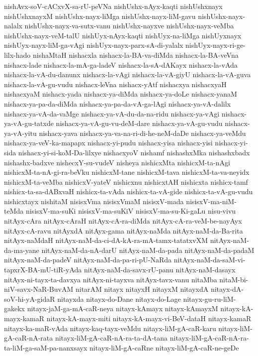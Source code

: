 {nishAvx-soV-cACxvX-sa-rU-peVNa
nishUshx-nAyx-kaqti
nishUshxnayx
nishUshxnayxM
nishUshx-nayx-liMga
nishUshx-nayx-liM-gavu
nishUshx-nayx-nalalx
nishUshx-nayx-va-sutx-vanu
nishUshx-nayxve
nishUshx-nayx-veMba
nishUshx-nayx-veM-talU
nishUyx-nAyx-kaqti
nishUyx-na-liMga
nishUyxnayx
nishUyx-nayx-liM-ga-vAgi
nishUyx-nayx-parx-sA-di-yalalx
nishUyx-nayx-ri-ge-lilx-hado
nishaMtaH
nishacxla
nishacx-la-BA-va-diMda
nishacx-la-BA-veVna
nishacx-lade
nishacx-la-mA-ga-ladeV
nishacx-la-sA-dAKayx
nishacx-la-vAda
nishacx-la-vA-du-danunx
nishacx-la-vAgi
nishacx-la-vA-giyU
nishacx-la-vA-guva
nishacx-la-vA-gu-vudu
nishacx-leVna
nishacx-yAtf
nishacxya
nishacxyaH
nishacxyaM
nishacx-yada
nishacx-ya-diMda
nishacx-ya-doLe
nishacx-yanaM
nishacx-ya-pa-da-diMda
nishacx-ya-pa-da-vA-ga-lAgi
nishacx-ya-vA-dalilx
nishacx-ya-vA-da-vaMge
nishacx-ya-vA-du-da-na-ridu
nishacx-ya-vAgi
nishacx-ya-vA-gu-tatxde
nishacx-ya-vA-gu-vu-deM-dare
nishacx-ya-vA-gu-vudu
nishacx-ya-vA-yitu
nishacx-yava
nishacx-ya-va-na-ri-di-he-neM-daDe
nishacx-ya-veMdu
nishacx-ya-veV-ka-mapapx
nishacx-yi-pudu
nishacx-yisa
nishacx-yisi
nishacx-yi-sida
nishacx-yi-si-koM-Da-lilxye
nishacxyoV
nishamf
nishashxMka
nishashxbadx
nishashx-badxve
nishecxY-su-vudeV
nisheya
nishicxMta
nishicxM-ta-nAgi
nishicxM-ta-nA-gi-ra-beVku
nishicxM-tane
nishicxM-tava
nishicxM-ta-va-neyidx
nishicxM-ta-veMba
nishicxV-yateV
nishicxnu
nishicxtAH
nishicxta
nishicx-tamf
nishicx-ta-sa-dABxvaH
nishicx-ta-vAda
nishicx-ta-vA-gide
nishicx-ta-vA-gu-vudu
nishicxtayx
nishitaM
nisisxVma
nisisxVmaM
nisisxV-mada
nisisxV-ma-niM-teMda
nisisxV-ma-suKi
nisisxV-ma-suKiV
nisisxV-ma-su-Ki-gaLu
nisu-vivu
nitAyx-cAra
nitAyx-cAraH
nitAyx-cA-ra-diMda
nitAyx-cA-ra-veM-be-nayAyx
nitAyx-cA-ravu
nitAyxdA
nitAyx-gama
nitAyx-naMda
nitAyx-naM-da-Ba-rita
nitAyx-naMdaH
nitAyx-naM-da-ci-dA-kA-ra-mA-tamx-tatatxvXM
nitAyx-naM-da-ma-yane
nitAyx-naM-da-nA-darU
nitAyx-naM-da-pada
nitAyx-naM-da-padaM
nitAyx-naM-da-padeV
nitAyx-naM-da-pa-ri-pU-NaRda
nitAyx-naM-da-saM-vi-tapxrX-BA-mU-tiR-yAda
nitAyx-naM-da-savx-rU-panu
nitAyx-naM-dasayx
nitAyx-ni-tayx-ta-davxya
nitAyx-ni-tayxva
nitAyx-tavx-vanu
nitaMba
nitaM-bi-niV-savx-NaR-BuvAM
nitarAM
nitayx
nitayxH
nitayxM
nitayxdA
nitayx-dA-soV-hi-yA-gidaR
nitayxda
nitayx-do-Dane
nitayx-do-Lage
nitayx-gu-ru-liM-gakekx
nitayx-jaM-ga-mA-caR-neya
nitayx-kAmayx
nitayx-kAmayxM
nitayx-kA-mayx-kamaR
nitayx-kA-mayx-miti
nitayx-kA-mayx-vi-BeV-dataH
nitayx-kamaR
nitayx-ka-maR-vAda
nitayx-kaq-tayx-veMdu
nitayx-liM-gA-caR-karu
nitayx-liM-gA-caR-nA-rata
nitayx-liM-gA-caR-nA-ra-ta-dA-tana
nitayx-liM-gA-caR-nA-ra-ta-liM-ga-saM-pa-nanxsayx
nitayx-liM-gA-caRne
nitayx-liM-gA-caR-ne-geDe
}
